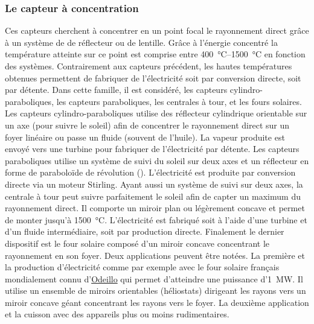 \subsubsection{Le capteur à concentration} %
\label{ssub:le_capteur_a_concentration}
Ces capteurs cherchent à concentrer en un point focal le rayonnement direct
grâce à un système de de réflecteur ou de lentille. Grâce à l’énergie concentré
la température atteinte sur ce point est comprise entre \SIrange{400}{1500}{\celsius}
en fonction des systèmes. Contrairement aux capteurs précédent, les hautes températures
obtenues permettent de fabriquer de l’électricité soit par conversion directe, soit par
détente. Dans cette famille, il est considéré, les capteurs
cylindro-paraboliques, les capteurs paraboliques, les centrales à tour, et les
fours solaires.
Les capteurs cylindro-paraboliques utilise des réflecteur cylindrique orientable
sur un axe (pour suivre le soleil) afin de concentrer le rayonnement direct sur un
foyer linéaire ou passe un fluide (souvent de l’huile). La vapeur produite est envoyé
vers une turbine pour fabriquer de l’électricité par détente.
Les capteurs paraboliques utilise un système de suivi du soleil sur deux axes
et un réflecteur en forme de paraboloïde de révolution ().
L’électricité est produite par conversion directe via un moteur Stirling.
Ayant aussi un système de suivi sur deux axes, la centrale à tour peut suivre parfaitement
le soleil afin de capter un maximum du rayonnement direct. Il comporte un miroir
plan ou légèrement concave et permet de monter jusqu’à \SI{1500}{\celsius}. L’électricité
est fabriqué soit à l’aide d’une turbine et d’un fluide intermédiaire, soit par
production directe. Finalement le dernier dispositif est le four solaire
composé d’un miroir concave concentrant le rayonnement en son foyer. Deux applications
peuvent être notées. La première et la production d’électricité
comme par exemple avec le four solaire français mondialement connu
d’\href{http://www.promes.cnrs.fr/index.php?page=historique}{Odeillo}
qui permet d’atteindre une puissance d’\SI{1}{\mega\watt}. Il utilise un ensemble
de miroirs orientables (héliostats) dirigeant les rayons vers un miroir concave géant
concentrant les rayons vers le foyer. La deuxième application et la cuisson avec
des appareils plus ou moins rudimentaires.


